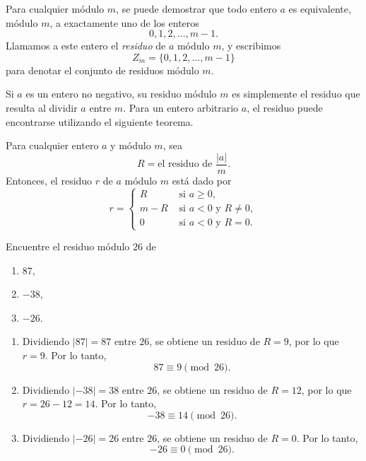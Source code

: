 \newpage

Para cualquier módulo $m$, se puede demostrar que todo entero $a$ es equivalente, módulo $m$, a exactamente uno de los enteros
$$0, 1, 2, \dots, m - 1.$$
Llamamos a este entero el \emph{residuo} de $a$ módulo $m$, y escribimos
$$Z_m = \{0, 1, 2, \dots, m - 1\}$$
para denotar el conjunto de residuos módulo $m$.

Si $a$ es un entero no negativo, su residuo módulo $m$ es simplemente el residuo que resulta al dividir $a$ entre $m$. Para un entero arbitrario $a$, el residuo puede encontrarse utilizando el siguiente teorema.

\begin{theorem}{}{}
    Para cualquier entero $a$ y módulo $m$, sea
    $$R = \text{el residuo de } \frac{|a|}{m}.$$
    Entonces, el residuo $r$ de $a$ módulo $m$ está dado por
    $$r = \begin{cases}
        R & \text{ si } a \geq 0, \\
        m - R & \text{ si } a < 0 \text{ y } R \neq 0, \\
        0 & \text{ si } a < 0 \text{ y } R = 0.
    \end{cases}$$
\end{theorem}

\begin{examplebox}{}{}
    Encuentre el residuo módulo $26$ de
    \begin{enumerate}[label=\alph*), topsep=6pt, itemsep=0pt]
        \item $87$,
        \item $-38$,
        \item $-26$.
    \end{enumerate}
    
    \tcblower
    \solucion
    \begin{enumerate}[label=\alph*), topsep=6pt, itemsep=0pt]
        \item Dividiendo $|87| = 87$ entre $26$, se obtiene un residuo de $R = 9$, por lo que $r = 9$. Por lo tanto,
        $$87 \equiv 9 \pmod{26}.$$
        \item Dividiendo $|-38| = 38$ entre $26$, se obtiene un residuo de $R = 12$, por lo que $r = 26 - 12 = 14$. Por lo tanto,
        $$-38 \equiv 14 \pmod{26}.$$
        \item Dividiendo $|-26| = 26$ entre $26$, se obtiene un residuo de $R = 0$. Por lo tanto,
        $$-26 \equiv 0 \pmod{26}.$$
    \end{enumerate}
\end{examplebox}

